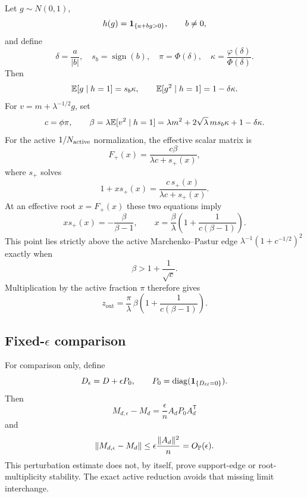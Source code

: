 Let $g\sim N(0,1)$,
\begin{equation}
h(g)=\mathbf{1}_{\{a+bg>0\}},\qquad b\ne0,
\end{equation}
and define
\begin{equation}
\delta=\frac a{|b|},\quad s_b=\operatorname{sign}(b),\quad
\pi=\Phi(\delta),\quad
\kappa=\frac{\varphi(\delta)}{\Phi(\delta)}.
\end{equation}
Then
\begin{equation}
\mathbb{E}[g\mid h=1]=s_b\kappa,\qquad
\mathbb{E}[g^2\mid h=1]=1-\delta\kappa.
\end{equation}
For $v=m+\lambda^{-1/2}g$, set
\begin{equation}
c=\phi\pi,\qquad
\beta=\lambda\mathbb{E}[v^2\mid h=1]
=\lambda m^2+2\sqrt\lambda\,m s_b\kappa+1-\delta\kappa.
\end{equation}
For the active $1/N_{\rm active}$ normalization, the effective scalar
matrix is
\begin{equation}
F_+(x)=\frac{c\beta}{\lambda c+s_+(x)},
\end{equation}
where $s_+$ solves
\begin{equation}
1+xs_+(x)=\frac{c\,s_+(x)}{\lambda c+s_+(x)}.
\end{equation}
At an effective root $x=F_+(x)$ these two equations imply
\begin{equation}
xs_+(x)=-\frac{\beta}{\beta-1},
\qquad
x=\frac{\beta}{\lambda}
\left(1+\frac1{c(\beta-1)}\right).
\end{equation}
This point lies strictly above the active Marchenko--Pastur edge
$\lambda^{-1}(1+c^{-1/2})^2$ exactly when
\begin{equation}
\beta>1+\frac1{\sqrt c}.
\end{equation}
Multiplication by the active fraction $\pi$ therefore gives
\begin{equation}
z_{\mathrm{out}}
=
\frac{\pi}{\lambda}\,
\beta\left(1+\frac1{c(\beta-1)}\right).
\end{equation}

\subsection{Fixed-\texorpdfstring{$\epsilon$}{epsilon} comparison}

For comparison only, define
\begin{equation}
D_\epsilon=D+\epsilon P_0,\qquad
P_0=\operatorname{diag}(\mathbf{1}_{\{D_{\ell\ell}=0\}}).
\end{equation}
Then
\begin{equation}
M_{d,\epsilon}-M_d
=\frac{\epsilon}{n}A_dP_0A_d^{\mathsf T}
\end{equation}
and
\begin{equation}
\|M_{d,\epsilon}-M_d\|
\le\epsilon\frac{\|A_d\|^2}{n}
=O_{\mathbb{P}}(\epsilon).
\end{equation}
This perturbation estimate does not, by itself, prove support-edge or root-multiplicity stability. The exact active reduction avoids that missing limit interchange.

